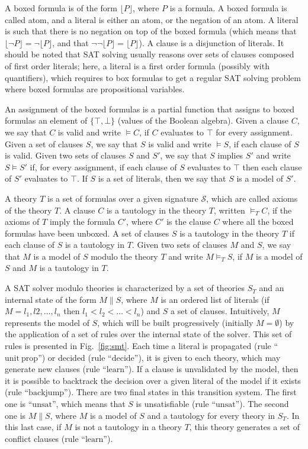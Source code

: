 A boxed formula is of the form $\lfloor{}P\rfloor$, where $P$ is a formula. A
boxed formula is called atom, and a literal is either an atom, or the negation
of an atom. A literal is such that there is no negation on top of the boxed
formula (which means that $\lfloor\neg{}P\rfloor=\neg\lfloor{}P\rfloor$, and
that $\neg\neg\lfloor{}P\rfloor=\lfloor{}P\rfloor$). A clause is a disjunction
of literals. It should be noted that SAT solving usually reasons over sets of
clauses composed of first order literals; here, a literal is a first order
formula (possibly with quantifiers), which requires to box formulas to get a
regular SAT solving problem where boxed formulas are propositional variables.

An assignment of the boxed formulas is a partial function that assigns to boxed
formulas an element of $\{\top,\bot\}$ (values of the Boolean algebra). Given a
clause $C$, we say that $C$ is valid and write $\models{}C$, if $C$ evaluates to
$\top$ for every assignment. Given a set of clauses $S$, we say that $S$ is
valid and write $\models{}S$, if each clause of $S$ is valid. Given two sets of
clauses $S$ and $S'$, we say that $S$ implies $S'$ and write $S\models{}S'$ if,
for every assignment, if each clause of $S$ evaluates to $\top$ then each clause
of $S'$ evaluates to $\top$. If $S$ is a set of literals, then we say that $S$
is a model of $S'$.

A theory $T$ is a set of formulas over a given signature $\mathcal{S}$, which
are called axioms of the theory $T$. A clause $C$ is a tautology in the theory
$T$, written $\models_TC$, if the axioms of $T$ imply the formula $C'$, where
$C'$ is the clause $C$ where all the boxed formulas have been unboxed. A set of
clauses $S$ is a tautology in the theory $T$ if each clause of $S$ is a
tautology in $T$. Given two sets of clauses $M$ and $S$, we say that $M$ is a
model of $S$ modulo the theory $T$ and write $M\models_TS$, if $M$ is a model of
$S$ and $M$ is a tautology in $T$.

A SAT solver modulo theories is characterized by a set of theories $S_T$ and an
internal state of the form $M\parallel{}S$, where $M$ is an ordered list of
literals (if $M=l_1,l2,\ldots,l_n$ then $l_1<l_2<\ldots<l_n$) and $S$ a set of
clauses. Intuitively, $M$ represents the model of $S$, which will be built
progressively (initially $M=\emptyset$) by the application of a set of rules
over the internal state of the solver. This set of rules is presented in
Fig.~\ref{fig:smt}. Each time a literal is propagated (rule
``$\mathrm{unit~prop}$'') or decided (rule ``$\mathrm{decide}$''), it is given
to each theory, which may generate new clauses (rule ``$\mathrm{learn}$''). If a
clause is unvalidated by the model, then it is possible to backtrack the
decision over a given literal of the model if it exists (rule
``$\mathrm{backjump}$'').  There are two final states in this transition
system. The first one is ``$\mathrm{unsat}$'', which means that $S$ is
unsatisfiable (rule ``$\mathrm{unsat}$''). The second one is $M\parallel{}S$,
where $M$ is a model of $S$ and a tautology for every theory in $S_T$. In this
last case, if $M$ is not a tautology in a theory $T$, this theory generates a
set of conflict clauses (rule ``$\mathrm{learn}$'').

